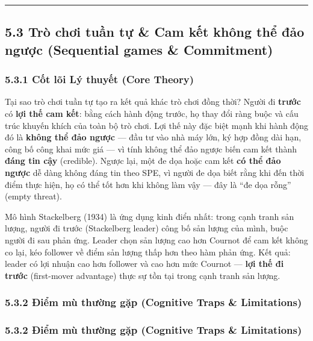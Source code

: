 \documentclass[
]{article}
\begin{document}
\begin{center}\rule{0.5\linewidth}{0.5pt}\end{center}

\subsection{5.3 Trò chơi tuần tự \& Cam kết không thể đảo ngược
(Sequential games \&
Commitment)}\label{truxf2-chux1a1i-tuux1ea7n-tux1ef1-cam-kux1ebft-khuxf4ng-thux1ec3-ux111ux1ea3o-ngux1b0ux1ee3c-sequential-games-commitment}

\subsubsection{5.3.1 Cốt lõi Lý thuyết (Core
Theory)}\label{cux1ed1t-luxf5i-luxfd-thuyux1ebft-core-theory-3}

Tại sao trò chơi tuần tự tạo ra kết quả khác trò chơi đồng thời? Người
đi \textbf{trước} có \textbf{lợi thế cam kết}: bằng cách hành động
trước, họ thay đổi ràng buộc và cấu trúc khuyến khích của toàn bộ trò
chơi. Lợi thế này đặc biệt mạnh khi hành động đó là \textbf{không thể
đảo ngược} --- đầu tư vào nhà máy lớn, ký hợp đồng dài hạn, công bố công
khai mức giá --- vì tính không thể đảo ngược biến cam kết thành
\textbf{đáng tin cậy} (credible). Ngược lại, một đe dọa hoặc cam kết
\textbf{có thể đảo ngược} dễ dàng không đáng tin theo SPE, vì người đe
dọa biết rằng khi đến thời điểm thực hiện, họ có thể tốt hơn khi không
làm vậy --- đây là ``đe dọa rỗng'' (empty threat).

Mô hình Stackelberg (1934) là ứng dụng kinh điển nhất: trong cạnh tranh
sản lượng, người đi trước (Stackelberg leader) công bố sản lượng của
mình, buộc người đi sau phản ứng. Leader chọn sản lượng cao hơn Cournot
để cam kết không co lại, kéo follower về điểm sản lượng thấp hơn theo
hàm phản ứng. Kết quả: leader có lợi nhuận cao hơn follower và cao hơn
mức Cournot --- \textbf{lợi thế đi trước} (first-mover advantage) thực
sự tồn tại trong cạnh tranh sản lượng.

\subsubsection{5.3.2 Điểm mù thường gặp (Cognitive Traps \&
Limitations)}\label{ux111iux1ec3m-muxf9-thux1b0ux1eddng-gux1eb7p-cognitive-traps-limitations-5}

\subsubsection{5.3.2 Điểm mù thường gặp (Cognitive Traps \&
Limitations)}\label{ux111iux1ec3m-muxf9-thux1b0ux1eddng-gux1eb7p-cognitive-traps-limitations-6}
\end{document}

